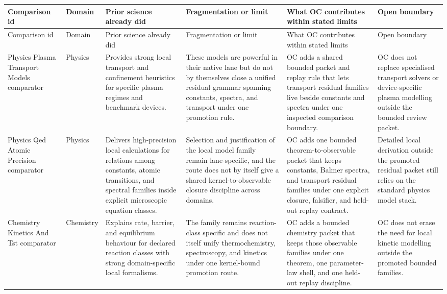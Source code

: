 \begin{longtable}{@{}L{0.17\textwidth}L{0.09\textwidth}L{0.17\textwidth}L{0.17\textwidth}L{0.20\textwidth}L{0.14\textwidth}@{}}
\toprule
Comparison id & Domain & Prior science already did & Fragmentation or limit & What OC contributes within stated limits & Open boundary \\
\midrule
\endfirsthead
\toprule
Comparison id & Domain & Prior science already did & Fragmentation or limit & What OC contributes within stated limits & Open boundary \\
\midrule
\endhead
Physics Plasma Transport Models comparator & Physics & Provides strong local transport and confinement heuristics for specific plasma regimes and benchmark devices. & These models are powerful in their native lane but do not by themselves close a unified residual grammar spanning constants, spectra, and transport under one promotion rule. & OC adds a shared bounded packet and replay rule that lets transport residual families live beside constants and spectra under one inspected comparison boundary. & OC does not replace specialised transport solvers or device-specific plasma modelling outside the bounded review packet. \\
Physics Qed Atomic Precision comparator & Physics & Delivers high-precision local calculations for relations among constants, atomic transitions, and spectral families inside explicit microscopic equation classes. & Selection and justification of the local model family remain lane-specific, and the route does not by itself give a shared kernel-to-observable closure discipline across domains. & OC adds one bounded theorem-to-observable packet that keeps constants, Balmer spectra, and transport residual families under one explicit closure, falsifier, and held-out replay contract. & Detailed local derivation outside the promoted residual packet still relies on the standard physics model stack. \\
Chemistry Kinetics And Tst comparator & Chemistry & Explains rate, barrier, and equilibrium behaviour for declared reaction classes with strong domain-specific local formalisms. & The family remains reaction-class specific and does not itself unify thermochemistry, spectroscopy, and kinetics under one kernel-bound promotion route. & OC adds a bounded chemistry packet that keeps those observable families under one theorem, one parameter-law shell, and one held-out replay discipline. & OC does not erase the need for local kinetic modelling outside the promoted bounded families. \\

\end{longtable}
